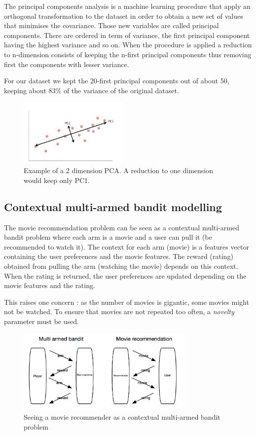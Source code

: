 \documentclass[letterpaper]{article}
\begin{document}
The principal components analysis is a machine learning procedure that apply an orthogonal transformation to the dataset in order to obtain a new set of values that minimises the covariance. Those new variables are called principal components. There are ordered in term of variance, the first principal component having the highest variance and so on. When the procedure is applied a reduction to n-dimension consists of keeping the n-first principal components thus removing first the components with lesser variance.

For our dataset we kept the 20-first principal components out of about 50, keeping about 83\% of the variance of the original dataset.

\begin{figure}[H]
\begin{center}
\includegraphics[width=2.1in]{img/pca.png}
\caption{Example of a 2 dimension PCA. A reduction to one dimension would keep only PC1.}
\label{pca}
\end{center}
\end{figure}

\subsection{Contextual multi-armed bandit modelling}

The movie recommendation problem can be seen as a contextual multi-armed bandit problem where each arm is a movie and a user can pull it (be recommended to watch it). The context for each arm (movie) is a features vector containing the user preferences and the movie features. The reward (rating) obtained from pulling the arm (watching the movie) depends on this context. When the rating is returned, the user preferences are updated depending on the movie features and the rating.

This raises one concern : as the number of movies is gigantic, some movies might not be watched. To ensure that movies are not repeated too often, a \textit{novelty} parameter must be used.

\begin{figure}[H]
\begin{center}
\includegraphics[width=3.4in]{img/schema.png}
\caption{Seeing a movie recommender as a contextual multi-armed bandit problem}
\label{schema}
\end{center}
\end{figure}
\end{document}
